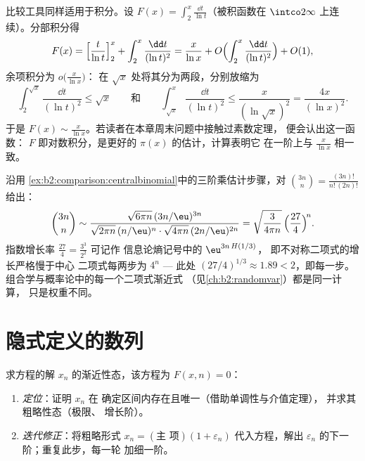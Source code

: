 \begin{example}\label{ex:b2:comparison:liworked}
比较工具同样适用于积分。设 $F(x) =
\int_2^x\frac{\dd t}{\ln t}$（被积函数在
$\intco2\infty$ 上连续）。分部积分得
\[
F(x) = \Bigl[\frac{t}{\ln t}\Bigr]_2^x +
\int_2^x\frac{\dd t}{(\ln t)^2}
= \frac{x}{\ln x} + O\Bigl(\int_2^x\frac{\dd t}{(\ln
t)^2}\Bigr) + O(1),
\]
余项积分为 $o\bigl(\frac{x}{\ln x}\bigr)$：
在 $\sqrt x$ 处将其分为两段，分别放缩为
\[
\int_2^{\sqrt x}\frac{\dd t}{(\ln t)^2} \leq \sqrt x
\qquad\text{和}\qquad
\int_{\sqrt x}^{x}\frac{\dd t}{(\ln t)^2} \leq
\frac{x}{(\ln\sqrt x)^2} = \frac{4x}{(\ln x)^2} .
\]
于是 $F(x) \sim \frac{x}{\ln x}$。若读者在本章周末问题中接触过素数定理，
便会认出这一函数：
$F$ 即对数积分，是更好的
$\pi(x)$ 的估计，计算表明它
在一阶上与 $\frac{x}{\ln x}$ 相一致。
\end{example}

\begin{example}[斯特林公式用于不对称二项式系数]\label{ex:b2:comparison:lopsided}
沿用
\cref{ex:b2:comparison:centralbinomial}中的三阶乘估计步骤，对
$\binom{3n}{n} = \frac{(3n)!}{n!\,(2n)!}$ 给出：
\[
\binom{3n}{n} \sim
\frac{\sqrt{6\pi n}\,(3n/\eu)^{3n}}
{\sqrt{2\pi n}\,(n/\eu)^{n}\cdot\sqrt{4\pi n}\,(2n/\eu)^{2n}}
= \sqrt{\frac{3}{4\pi n}}\,
\Bigl(\frac{27}{4}\Bigr)^{\!n} .
\]
指数增长率 $\frac{27}4 = \frac{3^3}{2^2}$ 可记作
信息论熵记号中的 $\eu^{3n\,H(1/3)}$，
即不对称二项式的增长严格慢于中心
二项式每两步为 $4^n$ --- 此处 $(27/4)^{1/3} \approx 1.89 < 2$，即每一步。
组合学与概率论中的每一个二项式渐近式
（见\cref{ch:b2:randomvar}）都是同一计算，
只是权重不同。
\end{example}

\section{隐式定义的数列}

\begin{method}\label{met:b2:comparison:implicit}
求方程的解 $x_n$ 的渐近性态，该方程为 $F(x, n) =
0$：
\begin{enumerate}
  \item \emph{定位}：证明 $x_n$ 在
        确定区间内存在且唯一（借助单调性与介值定理），
        并求其粗略性态（极限、
        增长阶）。
  \item \emph{迭代修正}：将粗略形式 $x_n = (\text{主
        项})(1 + \varepsilon_n)$ 代入方程，解出
        $\varepsilon_n$ 的下一阶；重复此步，每一轮
        加细一阶。
\end{enumerate}
\end{method}

